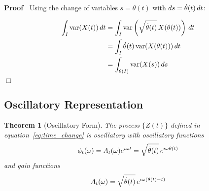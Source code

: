 \documentclass{article}
\newenvironment{proof}{\noindent\textbf{Proof\ }}{\hspace*{\fill}$\Box$\medskip}
\newtheorem{theorem}{Theorem}
\begin{document}
\begin{proof}
  Using the change of variables $s = \theta (t)$ with $ds = \dot{\theta} (t) 
  \hspace{0.17em} dt$:
  
  \begin{align}
    \int_I \mathrm{var} (X (t))  \hspace{0.17em} dt & = \int_I \mathrm{var}
    \left( \sqrt{\dot{\theta} (t)}  \hspace{0.17em} X (\theta (t)) \right) 
    \hspace{0.17em} dt \\
    & = \int_I \dot{\theta} (t) \hspace{0.17em} \mathrm{var} (X (\theta (t)))
    \hspace{0.17em} dt \\
    & = \int_{\theta (I)} \mathrm{var} (X (s))  \hspace{0.17em} ds 
  \end{align}
\end{proof}

\subsection{Oscillatory Representation}

\begin{theorem}
  [Oscillatory Form]\label{thm:osc_rep} The process $\{ Z (t) \}$ defined in
  equation~\eqref{eq:time_change} is oscillatory with oscillatory functions
  \begin{equation}
    \label{eq:phi_def} \phi_t (\omega) = A_t (\omega) e^{i \omega t} =
    \sqrt{\dot{\theta} (t)}  \hspace{0.17em} e^{i \omega \theta (t)}
  \end{equation}
  and gain functions \
  \begin{equation}
    A_t (\omega) = \sqrt{\dot{\theta} (t)}  \hspace{0.17em} e^{i \omega
    (\theta (t) - t)}
  \end{equation}
\end{theorem}
\end{document}
